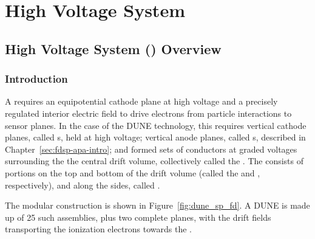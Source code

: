 \chapter{High Voltage System}
\label{ch:fdsp-hv}

\section{High Voltage System () Overview}
\label{sec:fdsp-hv-ov}


\subsection{Introduction}
\label{sec:fdsp-hv-intro}

A  requires an equipotential cathode plane at high voltage and a precisely regulated interior electric field to drive 
electrons from particle interactions to sensor planes.  In the case of the DUNE  technology, 
this requires vertical cathode planes, called s, held at high voltage; vertical anode planes, called s,  described in Chapter~\ref{sec:fdsp-apa-intro}; and formed sets of conductors at graded voltages surrounding the
 the central drift volume, collectively called the . The  consists of portions on the top and bottom  
of the drift volume (called the  and , respectively), and along the sides, called .


The modular  construction is shown in Figure~\ref{fig:dune_sp_fd}. A DUNE  is made up of 25 such assemblies, plus two complete   planes, with the  drift fields transporting the ionization electrons 
towards the .

